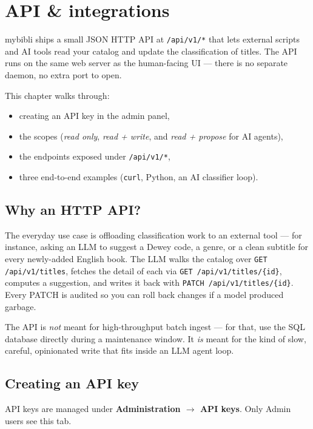 \chapter{API \& integrations}
\label{ch:api}

mybibli ships a small JSON HTTP API at \texttt{/api/v1/*} that lets
external scripts and AI tools read your catalog and update the
classification of titles. The API runs on the same web server as the
human-facing UI — there is no separate daemon, no extra port to open.

This chapter walks through:

\begin{itemize}
  \item creating an API key in the admin panel,
  \item the scopes (\emph{read only}, \emph{read + write}, and
        \emph{read + propose} for AI agents),
  \item the endpoints exposed under \texttt{/api/v1/*},
  \item three end-to-end examples (\texttt{curl}, Python, an AI
        classifier loop).
\end{itemize}

\section{Why an HTTP API?}

The everyday use case is offloading classification work to an
external tool — for instance, asking an LLM to suggest a Dewey
code, a genre, or a clean subtitle for every newly-added English
book. The LLM walks the catalog over \texttt{GET /api/v1/titles},
fetches the detail of each via \texttt{GET /api/v1/titles/\{id\}},
computes a suggestion, and writes it back with
\texttt{PATCH /api/v1/titles/\{id\}}. Every PATCH is audited so you
can roll back changes if a model produced garbage.

The API is \emph{not} meant for high-throughput batch ingest — for
that, use the SQL database directly during a maintenance window.
It \emph{is} meant for the kind of slow, careful, opinionated
write that fits inside an LLM agent loop.

\section{Creating an API key}
\label{sec:api-keys-create}

API keys are managed under \textbf{Administration \(\rightarrow\)
API keys}. Only Admin users see this tab.


